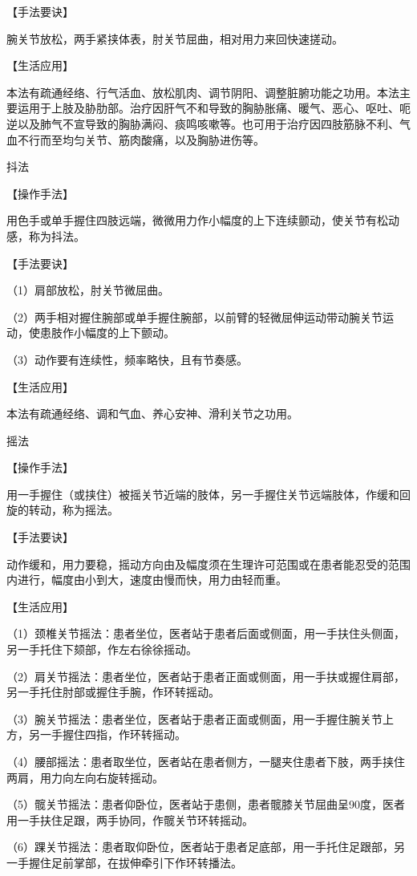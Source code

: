 \documentclass[12pt,UTF8,openany]{ctexbook}
\begin{document}
【手法要诀】

腕关节放松，两手紧挟体表，肘关节屈曲，相对用力来回快速搓动。

【生活应用】

本法有疏通经络、行气活血、放松肌肉、调节阴阳、调整脏腑功能之功用。本法主要运用于上肢及胁肋部。治疗因肝气不和导致的胸胁胀痛、暖气、恶心、呕吐、呃逆以及肺气不宣导致的胸胁满闷、痰鸣咳嗽等。也可用于治疗因四肢筋脉不利、气血不行而至均匀关节、筋肉酸痛，以及胸胁进伤等。

抖法

【操作手法】

用色手或单手握住四肢远端，微微用力作小幅度的上下连续颤动，使关节有松动感，称为抖法。

【手法要诀】

（1）肩部放松，肘关节微屈曲。

（2）两手相对握住腕部或单手握住腕部，以前臂的轻微屈伸运动带动腕关节运动，使患肢作小幅度的上下颤动。

（3）动作要有连续性，频率略快，且有节奏感。

【生活应用】

本法有疏通经络、调和气血、养心安神、滑利关节之功用。

摇法

【操作手法】

用一手握住（或挟住）被摇关节近端的肢体，另一手握住关节远端肢体，作缓和回旋的转动，称为摇法。

【手法要诀】

动作缓和，用力要稳，摇动方向由及幅度须在生理许可范围或在患者能忍受的范围内进行，幅度由小到大，速度由慢而快，用力由轻而重。

【生活应用】

（1）颈椎关节摇法：患者坐位，医者站于患者后面或侧面，用一手扶住头侧面，另一手托住下颏部，作左右徐徐摇动。

（2）肩关节摇法：患者坐位，医者站于患者正面或侧面，用一手扶或握住肩部，另一手托住肘部或握住手腕，作环转摇动。

（3）腕关节摇法：患者坐位，医者站于患者正面或侧面，用一手握住腕关节上方，另一手握住四指，作环转摇动。

（4）腰部摇法：患者取坐位，医者站在患者侧方，一腿夹住患者下肢，两手挟住两肩，用力向左向右旋转摇动。

（5）髋关节摇法：患者仰卧位，医者站于患侧，患者髋膝关节屈曲呈90度，医者用一手扶住足跟，两手协同，作髋关节环转摇动。

（6）踝关节摇法：患者取仰卧位，医者站于患者足底部，用一手托住足跟部，另一手握住足前掌部，在拔伸牵引下作环转播法。
\end{document}
